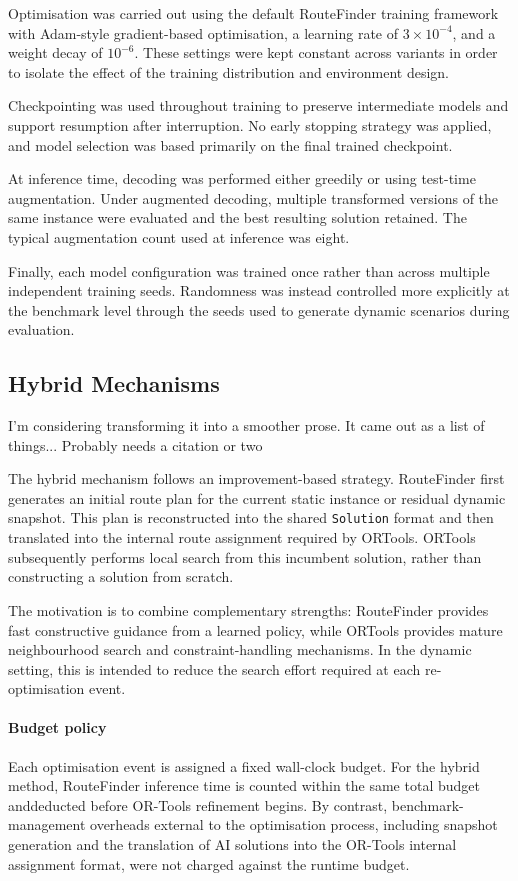 Optimisation was carried out using the default RouteFinder training framework
with Adam-style gradient-based optimisation, a learning rate of $3
    \times 10^{-4}$, and
a weight decay of $10^{-6}$. These settings were kept constant across variants
in order to isolate the effect of the training distribution and environment
design.

Checkpointing was used throughout training to preserve intermediate models and
support resumption after interruption. No early stopping strategy was applied,
and model selection was based primarily on the final trained checkpoint.

At inference time, decoding was performed either greedily or using test-time
augmentation. Under augmented decoding, multiple transformed versions of the
same instance were evaluated and the best resulting solution retained. The
typical augmentation count used at inference was eight.

Finally, each model configuration was trained once rather than across multiple
independent training seeds. Randomness was instead controlled more explicitly at
the benchmark level through the seeds used to generate dynamic scenarios during
evaluation.

\subsection{Hybrid Mechanisms}
\label{sec:hybrid}
{\color{red} I'm considering transforming it into a smoother prose. It came out
as a list of things... Probably needs a citation or two}

The hybrid mechanism follows an improvement-based strategy. RouteFinder first
generates an initial route plan for the current static instance or residual
dynamic snapshot. This plan is reconstructed into the shared
\texttt{Solution} format and then translated into the internal route assignment
required by ORTools. ORTools subsequently performs local search from this
incumbent solution, rather than constructing a solution from scratch.

The motivation is to combine complementary strengths: RouteFinder provides fast
constructive guidance from a learned policy, while ORTools provides mature
neighbourhood search and constraint-handling mechanisms. In the dynamic setting,
this is intended to reduce the search effort required at each re-optimisation
event.

\paragraph{Budget policy}
Each optimisation event is assigned a fixed wall-clock budget. For the hybrid
method, RouteFinder inference time is counted within the same total budget
anddeducted before OR-Tools refinement begins. By contrast, benchmark-management
overheads external to the optimisation process, including snapshot generation
and the translation of AI solutions into the OR-Tools internal assignment
format, were not charged against the runtime budget.
